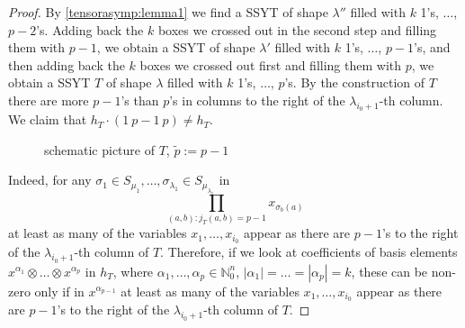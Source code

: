 \documentclass[a4paper]{amsart}
\def\N{{\mathbb{N}}}
\newcommand{\abs}[1]{\left| #1\right|}
\begin{document}
\begin{proof}
	By \cref{tensorasymp:lemma1} we find a SSYT of shape $\lambda''$ filled with $k$ 1's, $\ldots$, $p-2$'s.
	Adding back the $k$ boxes we crossed out in the second step and filling them with $p-1$, we obtain a SSYT of shape $\lambda'$ filled with $k$ 1's, $\ldots$, $p-1$'s,
	and then adding back the $k$ boxes we crossed out first and filling them with $p$, we obtain a SSYT $T$ of shape $\lambda$ filled with $k$ 1's, $\ldots$, $p$'s.
	By the construction of $T$ there are more $p-1$'s than $p$'s in columns to the right of the $\lambda_{i_0+1}$-th column.
	We claim that $h_T\cdot (1\ p-1\ p)\neq h_T$.

	\begin{figure}[H]
		\centering
		\caption*{schematic picture of $T$, $\tilde p:=p-1$}
	\end{figure}

	Indeed, for any $\sigma_1\in S_{\mu_1}, \ldots, \sigma_{\lambda_1}\in S_{\mu_{\lambda_1}}$ in
	\begin{displaymath}
		\prod\limits_{(a,b):j_T(a,b)=p-1}x_{\sigma_b(a)}
	\end{displaymath}
	at least as many of the variables $x_1,\ldots,x_{i_0}$ appear as there are $p-1$'s to the right of the $\lambda_{i_0+1}$-th column of $T$.
	Therefore,
	if we look at coefficients of basis elements $x^{\alpha_1}\otimes\ldots\otimes x^{\alpha_p}$ in $h_T$, where $\alpha_1,\ldots,\alpha_p\in\N_0^n$, $\abs{\alpha_1}=\ldots=\abs{\alpha_p}=k$,
	these can be non-zero only if in $x^{\alpha_{p-1}}$ at least as many of the variables $x_1,\ldots,x_{i_0}$ appear as there are $p-1$'s to the right of the $\lambda_{i_0+1}$-th column of $T$.
	

\end{proof}
\end{document}
